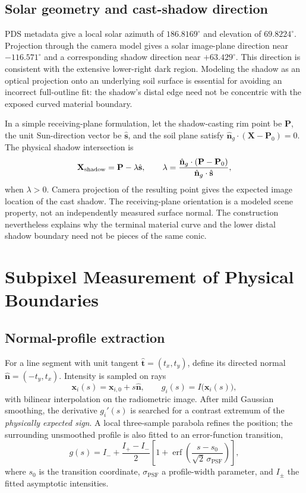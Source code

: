 \documentclass[11pt,letterpaper]{article}
\newcommand{\mat}[1]{\mathbf{#1}}
\begin{document}
\subsection{Solar geometry and cast-shadow direction}

PDS metadata give a local solar azimuth of \(186.8169^\circ\) and elevation of \(69.8224^\circ\). Projection through the camera model gives a solar image-plane direction near \(-116.571^\circ\) and a corresponding shadow direction near \(+63.429^\circ\). This direction is consistent with the extensive lower-right dark region. Modeling the shadow as an optical projection onto an underlying soil surface is essential for avoiding an incorrect full-outline fit: the shadow's distal edge need not be concentric with the exposed curved material boundary.

In a simple receiving-plane formulation, let the shadow-casting rim point be \(\mat P\), the unit Sun-direction vector be \(\hat{\mat s}\), and the soil plane satisfy \(\hat{\mat n}_g\cdot(\mat X-\mat P_0)=0\). The physical shadow intersection is
\begin{equation}
 \mat X_{\rm shadow}=\mat P-\lambda\hat{\mat s},\qquad
 \lambda=\frac{\hat{\mat n}_g\cdot(\mat P-\mat P_0)}{\hat{\mat n}_g\cdot\hat{\mat s}},
 \label{eq:shadow}
\end{equation}
when \(\lambda>0\). Camera projection of the resulting point gives the expected image location of the cast shadow. The receiving-plane orientation is a modeled scene property, not an independently measured surface normal. The construction nevertheless explains why the terminal material curve and the lower distal shadow boundary need not be pieces of the same conic.


\section{Subpixel Measurement of Physical Boundaries}
\label{sec:edges}

\subsection{Normal-profile extraction}

For a line segment with unit tangent \(\hat{\mat t}=(t_x,t_y)\), define its directed normal \(\hat{\mat n}=(-t_y,t_x)\). Intensity is sampled on rays
\begin{equation}
 \mat x_i(s)=\mat x_{i,0}+s\hat{\mat n},\qquad
 g_i(s)=I\bigl(\mat x_i(s)\bigr),
\end{equation}
with bilinear interpolation on the radiometric image. After mild Gaussian smoothing, the derivative \(g_i'(s)\) is searched for a contrast extremum of the \emph{physically expected sign}. A local three-sample parabola refines the position; the surrounding unsmoothed profile is also fitted to an error-function transition,
\begin{equation}
 g(s)=I_-+\frac{I_+-I_-}{2}
 \left[1+\operatorname{erf}\left(\frac{s-s_0}{\sqrt 2\,\sigma_{\mathrm{PSF}}}\right)\right],
 \label{eq:erf}
\end{equation}
where \(s_0\) is the transition coordinate, \(\sigma_{\mathrm{PSF}}\) a profile-width parameter, and \(I_\pm\) the fitted asymptotic intensities.
\end{document}
